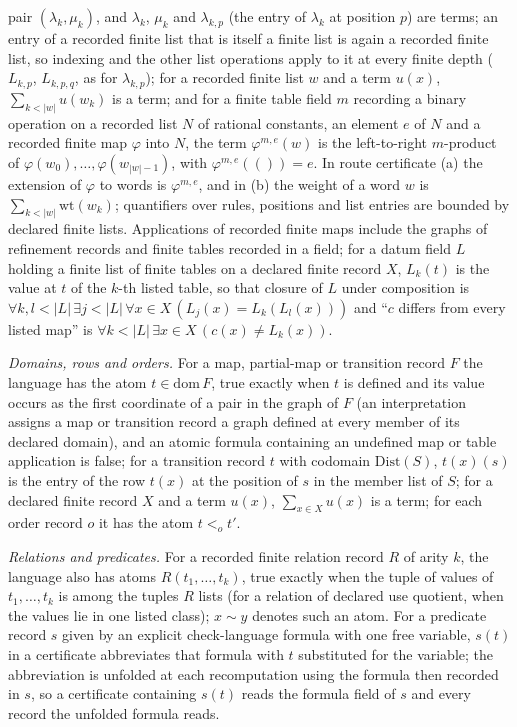 \documentclass[11pt]{article}
\theoremstyle{definition}
\begin{document}
pair \((\lambda_k,\mu_k)\), and \(\lambda_k\), \(\mu_k\) and \(\lambda_{k,p}\) (the entry of
\(\lambda_k\) at position \(p\)) are terms; an entry of a recorded finite list that is itself a
finite list is again a recorded finite list, so indexing and the other list
operations apply to it at every finite depth (\(L_{k,p}\), \(L_{k,p,q}\), as for
\(\lambda_{k,p}\)); for a recorded finite list \(w\) and a term
\(u(x)\), \(\sum_{k<|w|}u(w_k)\) is a term; and for a finite table field \(m\)
recording a binary operation on a recorded list \(N\) of rational constants,
an element \(e\) of \(N\) and a recorded finite map \(\varphi\) into \(N\), the
term \(\varphi^{m,e}(w)\) is the left-to-right \(m\)-product of
\(\varphi(w_0),\dots,\varphi(w_{|w|-1})\), with \(\varphi^{m,e}(())=e\). In route
certificate (a) the extension of \(\varphi\) to words is \(\varphi^{m,e}\), and in
(b) the weight of a word \(w\) is \(\sum_{k<|w|}\mathrm{wt}(w_k)\); quantifiers over rules, positions and list
entries are bounded by declared finite lists. Applications of recorded finite
maps include the graphs of refinement records and finite tables recorded in a
field; for a datum field \(L\) holding a finite list of finite tables on a
declared finite record \(X\), \(L_k(t)\) is the value at \(t\) of the \(k\)-th
listed table, so that closure of \(L\) under composition is
\(\forall k,l<|L|\,\exists j<|L|\,\forall x\in X\,(L_j(x)=L_k(L_l(x)))\) and ``\(c\)
differs from every listed map'' is
\(\forall k<|L|\,\exists x\in X\,(c(x)\neq L_k(x))\). \par\emph{Domains, rows and orders.} For a map, partial-map or transition record \(F\) the language has the atom
\(t\in\mathrm{dom}\,F\), true exactly when \(t\) is defined and its value
occurs as the first coordinate of a pair in the graph of \(F\) (an
interpretation assigns a map or transition record a graph defined at every
member of its declared domain), and an atomic formula containing an undefined
map or table application is false; for a transition record \(t\) with
codomain \(\mathrm{Dist}(S)\), \(t(x)(s)\) is the entry of the row \(t(x)\)
at the position of \(s\) in the member list of \(S\); for a declared finite record \(X\) and a term \(u(x)\),
\(\sum_{x\in X}u(x)\) is a term; for each order record \(o\) it has the atom
\(t<_o t'\).
\par\emph{Relations and predicates.} For a recorded finite relation record \(R\)
of arity \(k\), the language also has atoms \(R(t_1,\dots,t_k)\), true exactly
when the tuple of values of \(t_1,\dots,t_k\) is among the tuples \(R\) lists
(for a relation of declared use quotient, when the values lie in one listed
class); \(x\sim y\) denotes such an atom. For a predicate record \(s\) given by
an explicit check-language formula with one free variable, \(s(t)\) in a
certificate abbreviates that formula with \(t\) substituted for the variable; the abbreviation is unfolded at each recomputation using the formula then recorded in \(s\), so a certificate containing \(s(t)\) reads the formula field of \(s\) and every record the unfolded formula reads.
\end{document}
